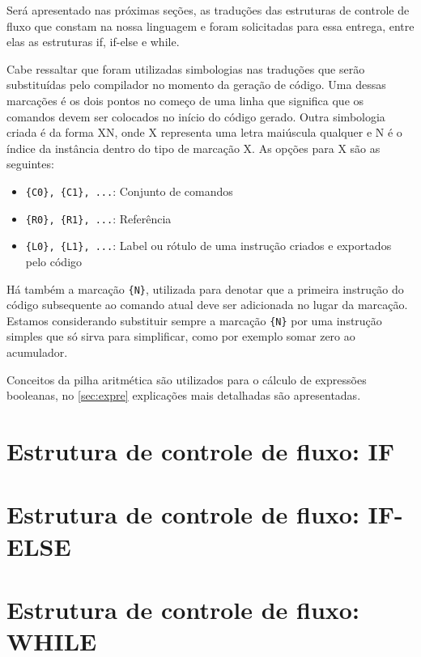 
Será apresentado nas próximas seções, as traduções das estruturas de controle de fluxo que constam na nossa linguagem e foram solicitadas para essa entrega, entre elas as estruturas if, if-else e while.

Cabe ressaltar que foram utilizadas simbologias nas traduções que serão substituídas pelo compilador no momento da geração de código. Uma dessas marcações é os dois pontos no começo de uma linha que significa que os comandos devem ser colocados no início do código gerado. Outra simbologia criada é da forma {XN}, onde X representa uma letra maiúscula qualquer e N é o índice da instância dentro do tipo de marcação X. As opções para X são as seguintes:

\begin{itemize}
	\item \verb={C0}, {C1}, ...=: Conjunto de comandos
	\item \verb={R0}, {R1}, ...=: Referência
	\item \verb={L0}, {L1}, ...=: Label ou rótulo de uma instrução criados
            e exportados pelo código 
\end{itemize}

Há também a marcação \verb={N}=, utilizada para denotar que a primeira instrução do código subsequente ao comando atual deve ser adicionada no lugar da marcação. Estamos considerando substituir sempre a marcação \verb={N}= por uma instrução simples que só sirva para simplificar, como por exemplo somar zero ao acumulador.

Conceitos da pilha aritmética são utilizados para o cálculo de expressões
booleanas, no \autoref{sec:expre} explicações mais detalhadas são apresentadas. 

\section{Estrutura de controle de fluxo: IF}
\label{sec:if}



\section{Estrutura de controle de fluxo: IF-ELSE}
\label{sec:if-else}



\section{Estrutura de controle de fluxo: WHILE}
\label{sec:while}


